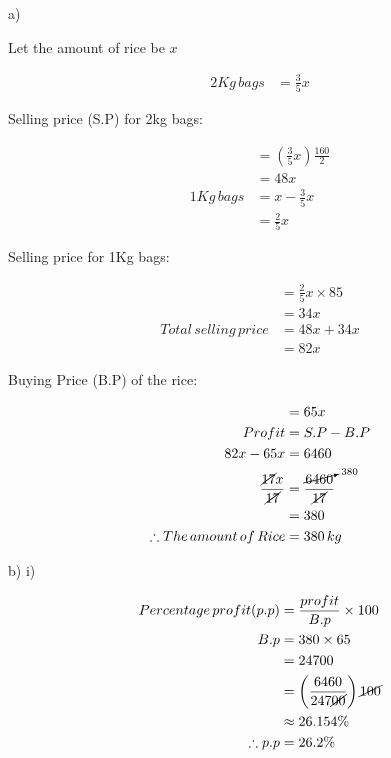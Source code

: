 \documentclass[
  a4paperpaper,
]{scrbook}
\begin{document}
\begin{tcolorbox}[enhanced jigsaw, left=2mm, colframe=quarto-callout-caution-color-frame, toptitle=1mm, opacitybacktitle=0.6, rightrule=.15mm, colbacktitle=quarto-callout-caution-color!10!white, colback=white, arc=.35mm, breakable, leftrule=.75mm, bottomtitle=1mm, bottomrule=.15mm, title=\textcolor{quarto-callout-caution-color}{\faFire}\hspace{0.5em}{Solution}, titlerule=0mm, coltitle=black, toprule=.15mm, opacityback=0]

a)

Let the amount of rice be \(x\)

\begin{align*}
2Kg \,bags&=\frac{3}{5}x
\end{align*}

Selling price (S.P) for 2kg bags:

\begin{align*}
 &=\left(\frac{3}{5}x\right)\frac{160}{2}\\
 &=48x\\ 1Kg\, bags&=x-\frac{3}{5}x\\&=\frac{2}{5}x
 \end{align*}

Selling price for 1Kg bags:

\begin{align*}
&=\frac{2}{5}x\times 85\\&=34x\\
Total \,selling \,price&=48x+34x\\&=82x
\end{align*}

Buying Price (B.P) of the rice:

\begin{align*}
&=65x\\
Profit&=S.P-B.P\\ 82x-65x&=6460 \\ \frac{\cancel{17}x}{\cancel{17}}&=\frac{\cancelto{380}{6460}}{\cancel{17}}\\&=380\\
\therefore The \,amount \,of \,Rice &=380 \,kg
\end{align*}

b) i)

\begin{align*}
Percentage\, profit (p.p)&=\frac{profit}{B.p}\times 100\\
B.p&=380\times 65\\&=24700\\
&=\left(\frac{6460}{247\cancel{00}}\right)\cancel{100}\\
&\approx 26.154\%\\
\therefore p.p&= 26.2\%
\end{align*}


\end{tcolorbox}
\end{document}
